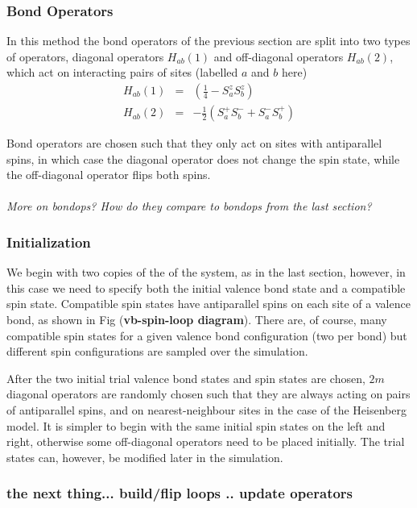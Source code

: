 \documentclass[prb,aps,twocolumn,floatfix,amsmath,amssymb,superscriptaddress,tightenlines]{revtex4}
\begin{document}
\subsubsection{Bond Operators}

In this method the bond operators of the previous section are split into two types of  operators, diagonal operators $H_{ab}(1)$ and off-diagonal operators $H_{ab}(2)$, which act on interacting pairs of sites (labelled $a$ and $b$ here)
\begin{eqnarray}
	H_{ab}(1) &=&(\tfrac{1}{4} - S^z_aS^z_b) \\
	H_{ab}(2) &=& %
		        -\tfrac{1}{2}(S_a^+S_b^- + S_a^-S_b^+)
\end{eqnarray}

Bond operators are chosen such that they only act on sites with antiparallel spins, in which case the diagonal operator does not change the spin state, while the off-diagonal operator  flips both spins.
\\\\{\it More on bondops? How do they compare to bondops from the last section?}
\\

\subsubsection{Initialization}
We begin with two copies of the of the system, as in the last section, however, in this case we need to specify both the initial valence bond state and a compatible spin state.
Compatible spin states have antiparallel spins on each site of a valence bond, as shown in Fig ({\bf \!vb-spin-loop diagram}).  There are, of course, many compatible spin states for a given valence bond configuration (two per bond) but different spin configurations are sampled over the simulation.

After the two initial trial valence bond states and spin states are chosen, $2m$ diagonal operators are randomly chosen such that they are always acting on pairs of antiparallel spins, and on nearest-neighbour sites in the case of the Heisenberg model.
It is simpler to begin with the same initial spin states on the left and right, otherwise some off-diagonal operators need to be placed initially.
The trial states can, however, be modified later in the simulation.

\subsubsection{the next thing... build/flip loops .. update operators}
\end{document}
